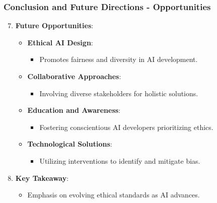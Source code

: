 \documentclass[aspectratio=169]{beamer}
\begin{document}
\begin{frame}[fragile]
  \frametitle{Conclusion and Future Directions - Opportunities}
  
  \begin{enumerate}
      \setcounter{enumi}{6}
      \item \textbf{Future Opportunities}:
      \begin{itemize}
          \item \textbf{Ethical AI Design}: 
          \begin{itemize}
              \item Promotes fairness and diversity in AI development.
          \end{itemize}

          \item \textbf{Collaborative Approaches}:
          \begin{itemize}
              \item Involving diverse stakeholders for holistic solutions.
          \end{itemize}

          \item \textbf{Education and Awareness}:
          \begin{itemize}
              \item Fostering conscientious AI developers prioritizing ethics.
          \end{itemize}

          \item \textbf{Technological Solutions}: 
          \begin{itemize}
              \item Utilizing interventions to identify and mitigate bias.
          \end{itemize}
      \end{itemize}
  
      \item \textbf{Key Takeaway}:
      \begin{itemize}
          \item Emphasis on evolving ethical standards as AI advances.
      \end{itemize}
  \end{enumerate}
\end{frame}
\end{document}
